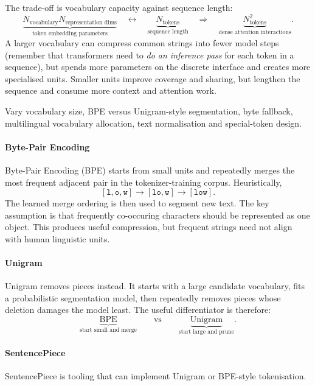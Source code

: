 The trade-off is vocabulary capacity against sequence length:
\[
    \underbrace{N_{\text{vocabulary}}N_{\text{representation dims}}}_{\text{token embedding parameters}}
    \quad\leftrightarrow\quad
    \underbrace{N_{\text{tokens}}}_{\text{sequence length}}
    \quad\Rightarrow\quad
    \underbrace{N_{\text{tokens}}^2}_{\text{dense attention interactions}}.
\]
A larger vocabulary can compress common strings into fewer model steps (remember that transformers need to \textit{do an inference pass} for each token in a sequence), but spends more parameters on the discrete interface and creates more specialised units.
Smaller units improve coverage and sharing, but lengthen the sequence and consume more context and attention work.

\begin{calloutdegreeofexperiment}
Vary vocabulary size, BPE versus Unigram-style segmentation, byte fallback, multilingual vocabulary allocation, text normalisation and special-token design.
\end{calloutdegreeofexperiment}


\paragraph{Byte-Pair Encoding}
Byte-Pair Encoding (BPE) starts from small units and repeatedly merges the most frequent adjacent pair in the tokenizer-training corpus.
Heuristically,
\[
    [\texttt{l},\texttt{o},\texttt{w}]
    \rightarrow
    [\texttt{lo},\texttt{w}]
    \rightarrow
    [\texttt{low}].
\]
The learned merge ordering is then used to segment new text.
The key assumption is that frequently co-occuring characters should be represented as one object.
This produces useful compression, but frequent strings need not align with human linguistic units.

\paragraph{Unigram}
Unigram removes pieces instead. 
It starts with a large candidate vocabulary, fits a probabilistic segmentation model, then repeatedly removes pieces whose deletion damages the model least.
The useful differentiator is therefore:
\[
    \underbrace{\text{BPE}}_{\text{start small and merge}}
    \qquad\text{vs}\qquad
    \underbrace{\text{Unigram}}_{\text{start large and prune}}.
\]
\paragraph{SentencePiece} SentencePiece is tooling that can implement Unigram or BPE-style tokenisation.

